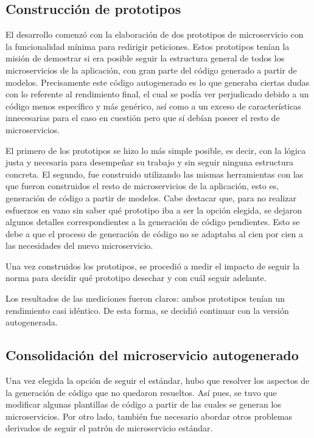 \documentclass[11pt,spanish,listoffigures]{tfgetsinf}
\begin{document}
\subsection{Construcción de prototipos}

El desarrollo comenzó con la elaboración de dos prototipos de microservicio con la funcionalidad mínima para redirigir peticiones. Estos prototipos tenían la misión de demostrar si era posible seguir la estructura general de todos los microservicios de la aplicación, con gran parte del código generado a partir de modelos. Precisamente este código autogenerado es lo que generaba ciertas dudas con lo referente al rendimiento final, el cual se podía ver perjudicado debido a un código menos específico y más genérico, así como a un exceso de características innecesarias para el caso en cuestión pero que sí debían poseer el resto de microservicios.

El primero de los prototipos se hizo lo más simple posible, es decir, con la lógica justa y necesaria para desempeñar su trabajo y sin seguir ninguna estructura concreta. El segundo, fue construido utilizando las mismas herramientas con las que fueron construidos el resto de microservicios de la aplicación, esto es, generación de código a partir de modelos. Cabe destacar que, para no realizar esfuerzos en vano sin saber qué prototipo iba a ser la opción elegida, se dejaron algunos detalles correspondientes a la generación de código pendientes. Esto se debe a que el proceso de generación de código no se adaptaba al cien por cien a las necesidades del nuevo microservicio.

Una vez construidos los prototipos, se procedió a medir el impacto de seguir la norma para decidir qué prototipo desechar y con cuál seguir adelante.

Los resultados de las mediciones fueron claros: ambos prototipos tenían un rendimiento casi idéntico. De esta forma, se decidió continuar con la versión autogenerada.

\subsection{Consolidación del microservicio autogenerado}

Una vez elegida la opción de seguir el estándar, hubo que resolver los aspectos de la generación de código que no quedaron resueltos. Así pues, se tuvo que modificar algunas plantillas de código a partir de las cuales se generan los microservicios. Por otro lado, también fue necesario abordar otros problemas derivados de seguir el patrón de microservicio estándar.
\end{document}
